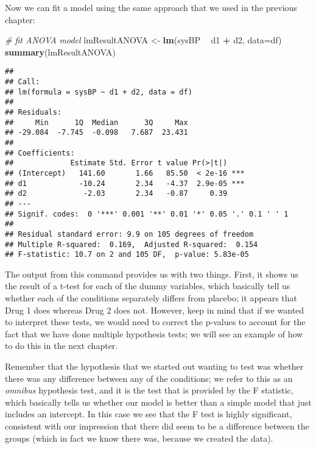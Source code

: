 \documentclass[]{book}
\newenvironment{Shaded}{\begin{snugshade}}{\end{snugshade}}
\newcommand{\KeywordTok}[1]{\textcolor[rgb]{0.13,0.29,0.53}{\textbf{#1}}}
\newcommand{\DataTypeTok}[1]{\textcolor[rgb]{0.13,0.29,0.53}{#1}}
\newcommand{\StringTok}[1]{\textcolor[rgb]{0.31,0.60,0.02}{#1}}
\newcommand{\CommentTok}[1]{\textcolor[rgb]{0.56,0.35,0.01}{\textit{#1}}}
\newcommand{\OperatorTok}[1]{\textcolor[rgb]{0.81,0.36,0.00}{\textbf{#1}}}
\newcommand{\NormalTok}[1]{#1}
\theoremstyle{definition}
\theoremstyle{definition}
\theoremstyle{definition}
\theoremstyle{remark}
\begin{document}
Now we can fit a model using the same approach that we used in the
previous chapter:

\begin{Shaded}
\begin{Highlighting}[]
\CommentTok{# fit ANOVA model  }
\NormalTok{lmResultANOVA <-}\StringTok{ }\KeywordTok{lm}\NormalTok{(sysBP }\OperatorTok{~}\StringTok{ }\NormalTok{d1 }\OperatorTok{+}\StringTok{ }\NormalTok{d2, }\DataTypeTok{data=}\NormalTok{df)}
\KeywordTok{summary}\NormalTok{(lmResultANOVA)}
\end{Highlighting}
\end{Shaded}

\begin{verbatim}
## 
## Call:
## lm(formula = sysBP ~ d1 + d2, data = df)
## 
## Residuals:
##     Min      1Q  Median      3Q     Max 
## -29.084  -7.745  -0.098   7.687  23.431 
## 
## Coefficients:
##             Estimate Std. Error t value Pr(>|t|)    
## (Intercept)   141.60       1.66   85.50  < 2e-16 ***
## d1            -10.24       2.34   -4.37  2.9e-05 ***
## d2             -2.03       2.34   -0.87     0.39    
## ---
## Signif. codes:  0 '***' 0.001 '**' 0.01 '*' 0.05 '.' 0.1 ' ' 1
## 
## Residual standard error: 9.9 on 105 degrees of freedom
## Multiple R-squared:  0.169,  Adjusted R-squared:  0.154 
## F-statistic: 10.7 on 2 and 105 DF,  p-value: 5.83e-05
\end{verbatim}

The output from this command provides us with two things. First, it
shows us the result of a t-test for each of the dummy variables, which
basically tell us whether each of the conditions separately differs from
placebo; it appears that Drug 1 does whereas Drug 2 does not. However,
keep in mind that if we wanted to interpret these tests, we would need
to correct the p-values to account for the fact that we have done
multiple hypothesis tests; we will see an example of how to do this in
the next chapter.

Remember that the hypothesis that we started out wanting to test was
whether there was any difference between any of the conditions; we refer
to this as an \emph{omnibus} hypothesis test, and it is the test that is
provided by the F statistic, which basically tells us whether our model
is better than a simple model that just includes an intercept. In this
case we see that the F test is highly significant, consistent with our
impression that there did seem to be a difference between the groups
(which in fact we know there was, because we created the data).
\end{document}
